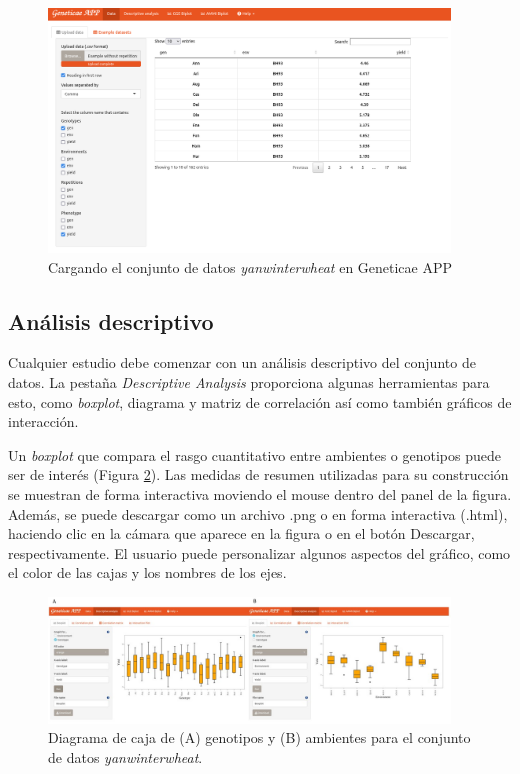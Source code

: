  \begin{figure}[H]
	\begin{center}
		\includegraphics[width=0.95\textwidth]{./Graficos/www/Data.png}
	\end{center}
	\caption{Cargando el conjunto de datos \emph{yanwinterwheat} en Geneticae APP}
	\label{fig:fig431}
\end{figure}


\subsection{Análisis descriptivo}

Cualquier estudio debe comenzar con un análisis descriptivo del conjunto de datos. La pestaña \emph{Descriptive Analysis} proporciona algunas herramientas para esto, como  \emph{boxplot}, diagrama y matriz de correlación así como también gráficos de interacción.

Un \emph{boxplot} que compara el rasgo cuantitativo entre ambientes o genotipos puede ser de interés (Figura \ref{fig:figdesc1}). Las medidas de resumen utilizadas para su construcción se muestran de forma interactiva moviendo el mouse dentro del panel de la figura. Además, se puede descargar como un archivo .png o en forma interactiva (.html), haciendo clic en la cámara que aparece en la figura o en el botón Descargar, respectivamente. El usuario puede personalizar algunos aspectos del gráfico, como el color de las cajas y los nombres de los ejes. 

\begin{figure}[H]
	\begin{center}
		\includegraphics[width=0.95\textwidth]{./Graficos/Boxplot.jpg}
	\end{center}
	\caption{Diagrama de caja de (A) genotipos y (B) ambientes para el conjunto de datos \emph{yanwinterwheat}.}
	\label{fig:figdesc1}
\end{figure}

